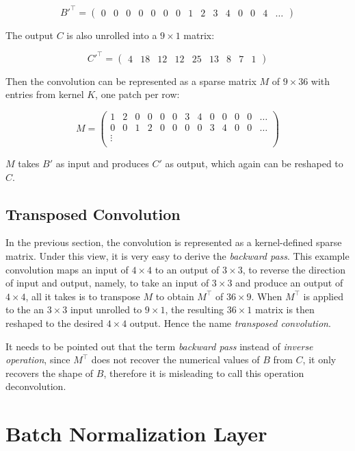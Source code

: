 $$
B'^\intercal =
  \begin{pmatrix}
    0 & 0 & 0 & 0 & 0 & 0 & 0 & 1 & 2 & 3 & 4 & 0 & 0 & 4 & \dots
  \end{pmatrix}
$$

The output $C$ is also unrolled into a $9 \times 1$ matrix:

$$
C'^\intercal =
  \begin{pmatrix}
    4 & 18 & 12 & 12 & 25 & 13 & 8 & 7 & 1
  \end{pmatrix}
$$

Then the convolution can be represented as a sparse matrix $M$ of $9 \times 36$ with entries from kernel $K$,
one patch per row:

$$
M =
  \begin{pmatrix}
    1 & 2 & 0 & 0 & 0 & 0 & 3 & 4 & 0 & 0 & 0 & 0 & \dots \\
    0 & 0 & 1 & 2 & 0 & 0 & 0 & 0 & 3 & 4 & 0 & 0 & \dots \\
    \vdots \\
  \end{pmatrix}
$$

$M$ takes $B'$ as input and produces $C'$ as output, which again can be reshaped to $C$.

\subsection{Transposed Convolution}

In the previous section, the convolution is represented as a kernel-defined sparse matrix. Under this view,
it is very easy to derive the \textit{backward pass}. This example convolution maps an input of $4 \times 4$
to an output of $3 \times 3$, to reverse the direction of input and output, namely, to take an input of
$3 \times 3$ and produce an output of $4 \times 4$, all it takes is to transpose $M$ to obtain $M^\intercal$
of $36 \times 9$. When $M^\intercal$ is applied to the an $3 \times 3$ input unrolled to $9 \times 1$, the
resulting $36 \times 1$ matrix is then reshaped to the desired $4 \times 4$ output. Hence the name
\textit{transposed convolution}.

It needs to be pointed out that the term \textit{backward pass} instead of \textit{inverse operation},
since $M^\intercal$ does not recover the numerical values of $B$ from $C$, it only recovers the shape of $B$,
therefore it is misleading to call this operation deconvolution.

\section{Batch Normalization Layer}

